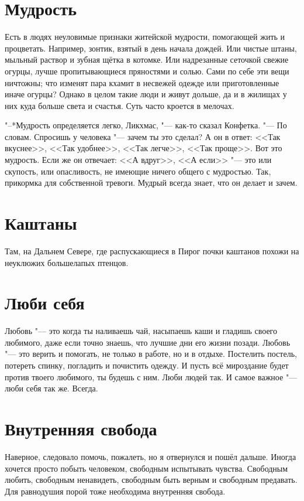\documentclass[a4paper,10pt]{book}
\begin{document}
\section{Мудрость}

 Есть в людях неуловимые признаки житейской мудрости, помогающей жить и 
процветать. Например, зонтик, взятый в день начала дождей. Или чистые штаны, 
мыльный раствор и зубная щётка в котомке. Или надрезанные сеточкой свежие 
огурцы, лучше пропитывающиеся пряностями и солью. Сами по себе эти вещи 
ничтожны; что изменят пара кхамит в несвежей одежде или приготовленные иначе 
огурцы? Однако в целом такие люди и живут дольше, да и в жилищах у них куда 
больше света и счастья. Суть часто кроется в мелочах.

"--*Мудрость определяется легко, Ликхмас, "--- как-то сказал Конфетка. "--- По 
словам. Спросишь у человека "--- зачем ты это сделал? А он в ответ: <<Так 
вкуснее>>, <<Так удобнее>>, <<Так легче>>, <<Так проще>>. Вот это мудрость. 
Если 
же он отвечает: <<А вдруг>>, <<А если>> "--- это или скупость, или опасливость, 
не имеющие ничего общего с мудростью. Так, прикормка для собственной тревоги. 
Мудрый всегда знает, что он делает и зачем.
 
 \section{Каштаны}

 Там, на Дальнем Севере, где распускающиеся в Пирог почки каштанов похожи на 
неуклюжих большелапых птенцов.
 
\section{Люби себя}
 
Любовь "--- это когда ты наливаешь чай, насыпаешь каши и гладишь своего 
любимого, даже если точно знаешь, что лучшие дни его жизни позади.
Любовь "--- это верить и помогать, не только в работе, но и в отдыхе. Постелить 
постель, потереть спинку, погладить и почистить одежду. И пусть всё мироздание 
будет против твоего любимого, ты будешь с ним. Люби людей так. И самое важное 
"--- люби себя так же. Всегда.
 
 \section{Внутренняя свобода}

  Наверное, следовало помочь, пожалеть, но я отвернулся и пошёл дальше. Иногда 
хочется просто побыть человеком, свободным испытывать чувства. Свободным 
любить, 
свободным ненавидеть, свободным быть верным и свободным предавать. Для 
равнодушия порой тоже необходима внутренняя свобода.
 
\end{document}
